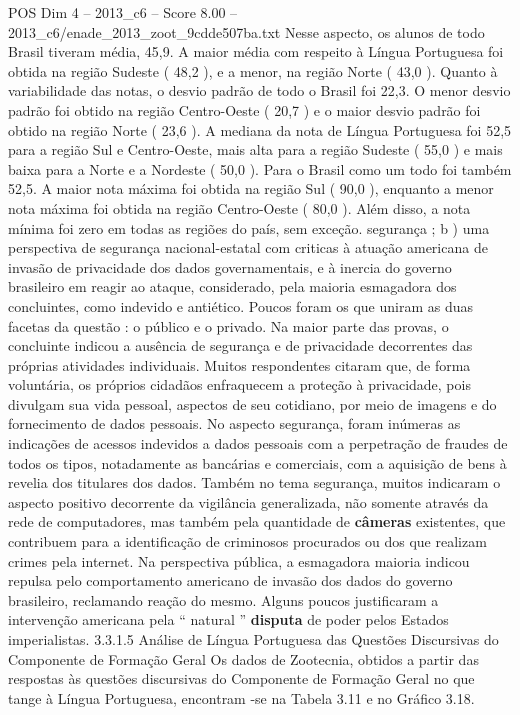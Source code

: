\begin{textsample}{POS Dim 4 – 2013\_c6 – Score 8.00 – 2013\_c6/enade\_2013\_zoot\_9cdde507ba.txt}
Nesse aspecto, os alunos de todo Brasil tiveram média, 45,9.
A maior média com respeito à Língua Portuguesa foi obtida na região Sudeste ( 48,2 ), e a menor, na região Norte ( 43,0 ).
Quanto à variabilidade das notas, o desvio padrão de todo o Brasil foi 22,3.
O menor desvio padrão foi obtido na região Centro-Oeste ( 20,7 ) e o maior desvio padrão foi obtido na região Norte ( 23,6 ).
A mediana da nota de Língua Portuguesa foi 52,5 para a região Sul e Centro-Oeste, mais alta para a região Sudeste ( 55,0 ) e mais baixa para a Norte e a Nordeste ( 50,0 ).
Para o Brasil como um todo foi também 52,5.
A maior nota máxima foi obtida na região Sul ( 90,0 ), enquanto a menor nota máxima foi obtida na região Centro-Oeste ( 80,0 ).
Além disso, a nota mínima foi zero em todas as regiões do país, sem exceção. segurança ; b ) uma perspectiva de segurança nacional-estatal com criticas à atuação americana de invasão de privacidade dos dados governamentais, e à inercia do governo brasileiro em reagir ao ataque, considerado, pela maioria esmagadora dos concluintes, como indevido e antiético.
Poucos foram os que uniram as duas facetas da questão : o público e o privado.
Na maior parte das provas, o concluinte indicou a ausência de segurança e de privacidade decorrentes das próprias atividades individuais.
Muitos respondentes citaram que, de forma voluntária, os próprios cidadãos enfraquecem a proteção à privacidade, pois divulgam sua vida pessoal, aspectos de seu cotidiano, por meio de imagens e do fornecimento de dados pessoais.
No aspecto segurança, foram inúmeras as indicações de acessos indevidos a dados pessoais com a perpetração de fraudes de todos os tipos, notadamente as bancárias e comerciais, com a aquisição de bens à revelia dos titulares dos dados.
Também no tema segurança, muitos indicaram o aspecto positivo decorrente da vigilância generalizada, não somente através da rede de computadores, mas também pela quantidade de \textbf{câmeras} existentes, que contribuem para a identificação de criminosos procurados ou dos que realizam crimes pela internet.
Na perspectiva pública, a esmagadora maioria indicou repulsa pelo comportamento americano de invasão dos dados do governo brasileiro, reclamando reação do mesmo.
Alguns poucos justificaram a intervenção americana pela “ natural ” \textbf{disputa} de poder pelos Estados imperialistas. 3.3.1.5 Análise de Língua Portuguesa das Questões Discursivas do Componente de Formação Geral Os dados de Zootecnia, obtidos a partir das respostas às questões discursivas do Componente de Formação Geral no que tange à Língua Portuguesa, encontram -se na Tabela 3.11 e no Gráfico 3.18.

\end{textsample}
